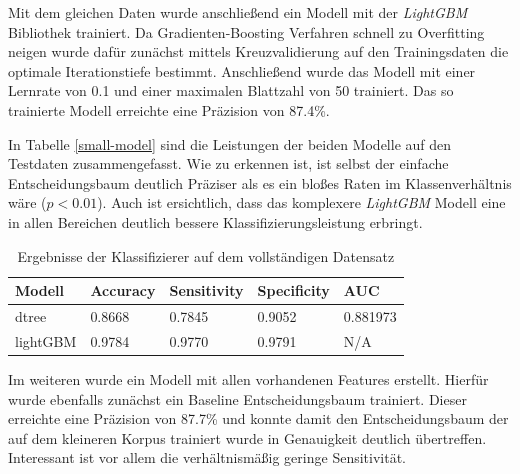 Mit dem gleichen Daten wurde anschließend ein Modell mit der \textit{LightGBM} Bibliothek\parencite[][]{lightgbm} trainiert.
Da Gradienten-Boosting Verfahren schnell zu Overfitting neigen wurde dafür zunächst mittels Kreuzvalidierung auf den Trainingsdaten die optimale Iterationstiefe bestimmt.
Anschließend wurde das Modell mit einer Lernrate von 0.1 und einer maximalen Blattzahl von 50 trainiert.
Das so trainierte Modell erreichte eine Präzision von 87.4\%.

In Tabelle \ref{small-model} sind die Leistungen der beiden Modelle auf den Testdaten zusammengefasst.
Wie zu erkennen ist, ist selbst der einfache Entscheidungsbaum deutlich Präziser als es ein bloßes Raten im Klassenverhältnis wäre ($p < 0.01$).
Auch ist ersichtlich, dass das komplexere \textit{LightGBM} Modell eine in allen Bereichen deutlich bessere Klassifizierungsleistung erbringt.

\begin{table}
    \begin{center}
        \begin{tabularx}{\textwidth}{X|XXXX}
            \toprule
            Modell & Accuracy & Sensitivity & Specificity & AUC\\
            \midrule
            dtree & 0.8668 & 0.7845 & 0.9052 & 0.881973 \\
            lightGBM\footnotemark & 0.9784 & 0.9770 & 0.9791 & N/A \\
            \bottomrule
        \end{tabularx}
        \caption{Ergebnisse der Klassifizierer auf dem vollständigen Datensatz}
        \label{full-model}
    \end{center}
\end{table}


Im weiteren wurde ein Modell mit allen vorhandenen Features erstellt.
Hierfür wurde ebenfalls zunächst ein Baseline Entscheidungsbaum trainiert.
Dieser erreichte eine Präzision von 87.7\% und konnte damit den Entscheidungsbaum der auf dem kleineren Korpus trainiert wurde in Genauigkeit deutlich übertreffen.
Interessant ist vor allem die verhältnismäßig geringe Sensitivität.

